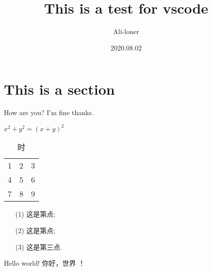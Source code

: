 \documentclass[a4paper]{article}
\title{This is a test for vscode}
\author{Ali-loner}
\date{2020.08.02}
\begin{document}
    \maketitle
    \begin{abstract}
        \lipsum[2]
    \end{abstract}
    \tableofcontents


    \section{This is a section}\label{sec:this-is-a-section}
    How are you?
    I'm fine thanks.

    $x^2+y^2 = (x+y)^2$
    \begin{table}[htbp]
        \centering
        \caption{时}
        \begin{tabular}{ccc}
            1 & 2 & 3 \\
            4 & 5 & 6 \\
            7 & 8 & 9
        \end{tabular}\label{tab:table}
    \end{table}
    \begin{enumerate}
        \item[(1)] 这是第点;
        \item[(2)] 这是第点;
        \item[(3)] 这是第三点.
    \end{enumerate}
    Hello world!
    你好，世界 ！
\end{document}
